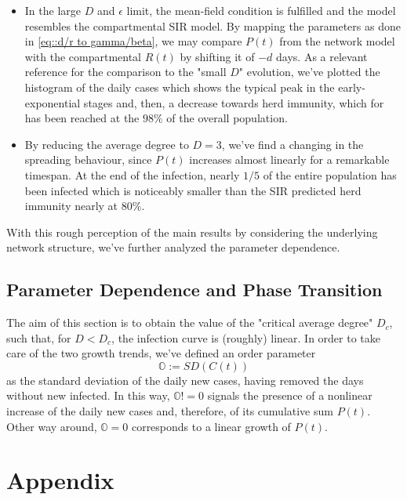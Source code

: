 \documentclass[a4paper,11pt,twoside]{report} %
\begin{document}
\begin{itemize}
    \item In the large $D$ and $\epsilon$ limit, the mean-field condition is fulfilled and the model resembles the compartmental  SIR model. By mapping the parameters as done in \ref{eq::d/r to gamma/beta}, we may compare $P(t)$ from the network model with the compartmental $R(t)$ by shifting it of $-d$ days.
    As a relevant reference for the comparison to the "small $D$" evolution, we've plotted the histogram of the daily cases which shows the typical peak in the early-exponential stages and, then, a decrease towards herd immunity, which for \cite{Thurner::NetBasedExpl} has been reached at the $98\%$ of the overall population. 
    \item By reducing the average degree to $D=3$, we've find a changing in the spreading behaviour, since $P(t)$ increases almost linearly for a remarkable timespan. At the end of the infection, nearly $1/5$ of the entire population has been infected which is noticeably smaller than the SIR predicted herd immunity nearly at $80\%$.
\end{itemize}

With this rough perception of the main results by considering the underlying network structure, we've further analyzed the parameter dependence.

\section{Parameter Dependence and Phase Transition}
The aim of this section is to obtain the value of the "critical average degree" $D_c$, such that, for $D<D_c$, the infection curve is (roughly) linear. In order to take care of the two growth trends, we've defined an order parameter 
\begin{equation}
    \label{def::sdc}
    \mathbb{O}:=SD(C(t))
\end{equation}{}
as the standard deviation of the daily new cases, having removed the days without new infected. In this way,     $\mathbb{O}!=0$ signals the presence of a nonlinear increase of the daily new cases and, therefore, of its cumulative sum $P(t)$. Other way around, $\mathbb{O}=0$ corresponds to a linear growth of $P(t)$.




\chapter{Appendix}
\end{document}
